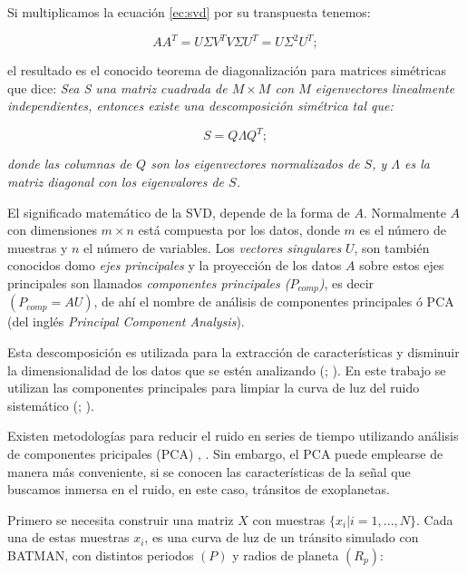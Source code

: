 Si multiplicamos la ecuación \ref{ec:svd} por su transpuesta tenemos:

\begin{equation}
  \displaystyle AA^{T}=U\Sigma V^{T} V\Sigma U^{T} = U \Sigma^{2} U^{T};
\end{equation}

\noindent el resultado es el conocido teorema de diagonalización para matrices simétricas que dice: \textit{Sea S una matriz cuadrada de $M\times M$ con $M$ eigenvectores linealmente independientes, entonces existe una descomposición simétrica tal que:}

\begin{equation*}
  \displaystyle S=Q\Lambda Q^{T};
\end{equation*}


\noindent \textit{donde las columnas de $Q$ son los eigenvectores normalizados de $S$, y $\Lambda$ es la matriz diagonal con los eigenvalores de $S$.}

El significado matemático de la SVD, depende de la forma de $A$. Normalmente $A$ con dimensiones $m\times n$ está compuesta por los datos, donde $m$ es el número de muestras y $n$ el número de variables. Los \textit{vectores singulares} $U$, son también conocidos domo \textit{ejes principales} y la proyección de los datos $A$ sobre estos ejes principales son llamados \textit{componentes principales ($P_{comp}$)}, es decir $(P_{comp}=AU)$, de ahí el nombre de análisis de componentes principales ó PCA (del inglés \textit{Principal Component Analysis}).

Esta descomposición es utilizada para la extracción de características y disminuir la dimensionalidad de los datos que se estén analizando (\cite{mcgurk2010principal}; \cite{medeiros2018principal}). En este trabajo se utilizan las componentes principales para limpiar la curva de luz del ruido sistemático (\cite{shin1999iterative}; \cite{bailey2012principal}).

Existen metodologías para reducir el ruido en series de tiempo utilizando análisis de componentes pricipales (PCA) \cite{shin1999iterative}, \cite{bailey2012principal}. Sin embargo, el PCA puede emplearse de manera más conveniente, si se conocen las características de la señal que buscamos inmersa en el ruido, en este caso, tránsitos de exoplanetas.

Primero se necesita construir una matriz $X$ con muestras $\{x_{i}|i=1,...,N\}$. Cada una de estas muestras $x_{i}$, es una curva de luz de un tránsito simulado con BATMAN, con distintos periodos $(P)$ y radios de planeta $(R_{p})$:

